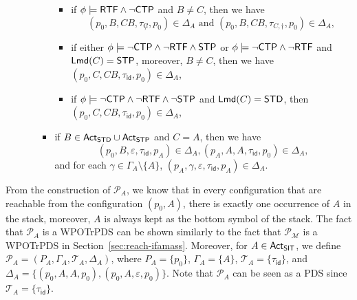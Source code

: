 \documentclass[preprint,12pt]{elsarticle}
\newcommand\Mm{{\mathcal{M} }}
\newcommand\Pp{{\mathcal{P} }}
\newcommand\act{{\sf Act}}
\newcommand\lmd{{\sf Lmd}}
\newcommand\standard{{\sf STD}}
\newcommand\singletop{{\sf STP}}
\newcommand\singleinstance{{\sf SIT}}
\newcommand\ctpflag{{\sf CTP}}
\newcommand\stpflag{{\sf STP}}
\newcommand\rtfflag{{\sf RTF}}
\newcommand{\id}{\mathsf{id}}
\newcommand\Aut{{\mathfrak{A} }}
\newcommand\Lang{{\mathscr{L} }}
\newcommand\TranSet{{\mathscr{T} }}
\newcommand{\PDS}{\textsf{PDS}}
\newcommand{\WOTrPDS}{\textsf{WPOTrPDS}}
\newcommand{\WOTrNFA}{\textsf{WPOTrNFA}}
\begin{document}
\begin{itemize}
\begin{itemize}
\begin{itemize}
\begin{itemize}
\begin{itemize}
				\end{itemize}
%
				\item if $\phi \models \rtfflag \wedge \neg\ctpflag$ and $B\neq C$,  then
                we have 
                $$(p_0, B, CB, \tau_{\not C}, p_0) \in \Delta_{A} \mbox{ and } (p_0, B, CB, \tau_{C, \dag}, p_0) \in \Delta_{A},$$
%
				\item if either $\phi \models \neg\ctpflag \wedge \neg \rtfflag \wedge \stpflag$ or $\phi \models \neg\ctpflag \wedge \neg \rtfflag$ and $\lmd(C) = \singletop$, moreover, $B \neq C$, then we have $(p_0, C, CB, \tau_{\id}, p_0) \in \Delta_{A}$, 
				\item if $\phi \models \neg\ctpflag \wedge \neg \rtfflag \wedge \neg \stpflag$ and $\lmd(C) = \standard$, then $(p_0, C, CB, \tau_{\id}, p_0) \in \Delta_{A}$,
				\end{itemize}
				
				\item if $B \in \act_\standard \cup \act_\singletop$ and $C = A$,  then we have 
				$$(p_0, B, \varepsilon, \tau_{\id}, p_A) \in \Delta_{A}, (p_A, A, A, \tau_{\id}, p_0)  \in \Delta_{A},$$ 
				and for each $\gamma \in \Gamma_A \setminus \{A\}$, $(p_A, \gamma, \varepsilon, \tau_{\id}, p_A) \in \Delta_{A}$. 
            \end{itemize}
        \end{itemize}
\end{itemize}
From the construction of $\Pp_A$, we know that in every configuration that are reachable from the configuration $(p_0, A)$, there is exactly one occurrence of $A$ in the stack, moreover,  $A$ is always kept as the bottom symbol of the stack. 
The fact that $\Pp_{A}$ is a {\WOTrPDS} can be shown similarly to the fact that $\Pp_\Mm$ is a {\WOTrPDS} in Section~\ref{sec:reach-ifamass}.
Moreover, for $A \in \act_\singleinstance$, we define $\Pp_A = (P_A, \Gamma_A, \TranSet_A, \Delta_A)$, where $P_A = \{p_0\}$, $\Gamma_A = \{A\}$, $\TranSet_A = \{\tau_{\id}\}$, and $\Delta_A = \{(p_0, A, A, p_0), (p_0, A, \varepsilon, p_0)\}$. Note that $\Pp_A$ can be seen as a {\PDS} since $\TranSet_A = \{\tau_{\id}\}$.
\end{document}
